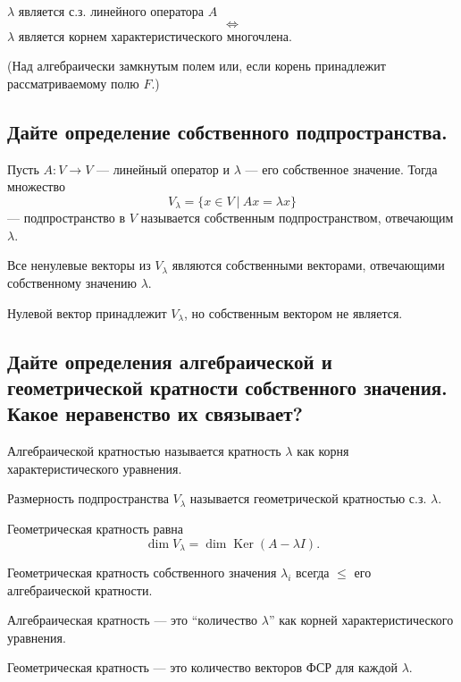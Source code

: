 \begin{theorem}
    $\lambda$ является с.з. линейного оператора $A$
    \[
        \Longleftrightarrow
    \]
    $\lambda$ является корнем характеристического многочлена.
    
    (Над алгебраически замкнутым полем или, если корень принадлежит рассматриваемому полю $F$.)
\end{theorem}

\subsection{Дайте определение собственного подпространства.}

\begin{definition}
    Пусть $A: V \to V$ --- линейный оператор и $\lambda$ --- его собственное значение. Тогда множество
    \[
        V_{\lambda} = \{x \in V\ |\ Ax = \lambda x\}
    \]
    --- подпространство в $V$ называется собственным подпространством, отвечающим $\lambda$.
\end{definition}
\begin{remark}
    Все ненулевые векторы из $V_{\lambda}$ являются собственными векторами,
    отвечающими собственному значению $\lambda$.
    
    Нулевой вектор принадлежит $V_{\lambda}$, но собственным вектором не является.
\end{remark}

\subsection{Дайте определения алгебраической и геометрической кратности собственного значения. Какое неравенство их связывает?}

\begin{definition}
    Алгебраической кратностью называется кратность $\lambda$ как корня характеристического уравнения.
\end{definition}

\begin{definition}
    Размерность подпространства $V_{\lambda}$ называется геометрической кратностью с.з. $\lambda$.
    
    Геометрическая кратность равна
    \[
        \dim V_{\lambda} = \dim \operatorname{Ker}(A - \lambda I).
    \]
\end{definition}

\begin{theorem}
    Геометрическая кратность собственного значения $\lambda_i$ всегда $\leq$ его алгебраической кратности.
\end{theorem}
\begin{remark}
    Алгебраическая кратность --- это ``количество $\lambda$'' как корней характеристического уравнения.
    
    Геометрическая кратность --- это количество векторов ФСР для каждой $\lambda$.

\end{remark}

